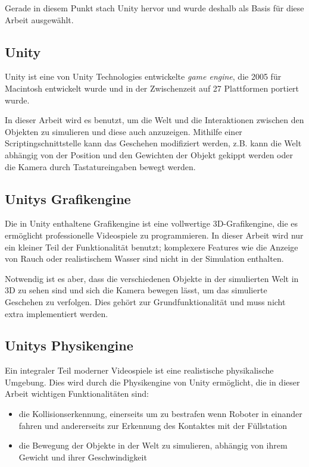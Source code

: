 Gerade in diesem Punkt stach Unity hervor und wurde deshalb als Basis f{\"{u}}r diese Arbeit ausgew{\"{a}}hlt.

\subsection{Unity}
Unity ist eine von Unity Technologies entwickelte \textit{game engine}, die 2005 f{\"{u}}r Macintosh entwickelt wurde und in der Zwischenzeit auf 27 Plattformen portiert wurde.

In dieser Arbeit wird es benutzt, um die Welt und die Interaktionen zwischen den Objekten zu simulieren und diese auch anzuzeigen. Mithilfe einer Scriptingschnittstelle kann das Geschehen modifiziert werden, z.B. kann die Welt
abh{\"{a}}ngig von der Position und den Gewichten der Objekt gekippt werden oder die Kamera durch Tastatureingaben bewegt werden.

\subsection{Unitys Grafikengine}
Die in Unity enthaltene Grafikengine ist eine vollwertige 3D-Grafikengine, die es erm{\"{o}}glicht professionelle Videospiele zu programmieren. In dieser Arbeit wird nur
ein kleiner Teil der Funktionalit{\"{a}}t benutzt; komplexere Features wie die Anzeige von Rauch oder realistischem Wasser sind nicht in der Simulation enthalten.

Notwendig ist es aber, dass die verschiedenen Objekte in der simulierten Welt in 3D zu sehen sind und sich die Kamera bewegen l{\"{a}}sst, um das simulierte Geschehen zu
verfolgen. Dies geh{\"{o}}rt zur Grundfunktionalit{\"{a}}t und muss nicht extra implementiert werden.

\subsection{Unitys Physikengine}
Ein integraler Teil moderner Videospiele ist eine realistische physikalische Umgebung. Dies wird durch die Physikengine von Unity erm{\"{o}}glicht, die in dieser Arbeit wichtigen Funktionalit{\"{a}}ten sind:

\begin{itemize}
\item die Kollisionserkennung, einerseits um zu bestrafen wenn Roboter in einander fahren und andererseits zur Erkennung des Kontaktes mit der F{\"{u}}llstation
\item die Bewegung der Objekte in der Welt zu simulieren, abh{\"{a}}ngig von ihrem Gewicht und ihrer Geschwindigkeit
\end{itemize}

